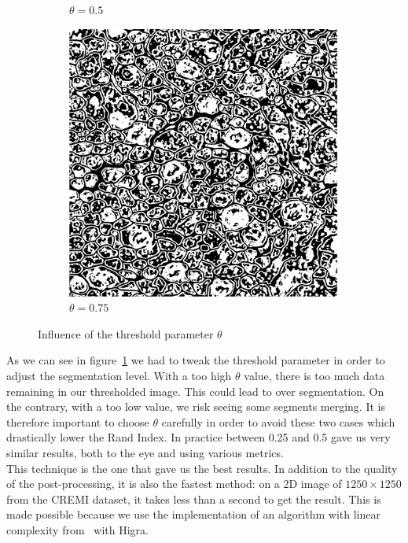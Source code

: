 \begin{figure}[!htbp]
\begin{subfigure}[t]{0.31\textwidth}
        \caption{$\theta = 0.5$}
    \end{subfigure}%
    \begin{subfigure}[t]{0.31\textwidth}
        \centering
        \includegraphics[height=0.9\textwidth]{./images/thresh_3.png}
        \caption{$\theta = 0.75$}
    \end{subfigure}
	\caption{Influence of the threshold parameter $\theta$}
	\label{fig:threshold}
\end{figure}

As we can see in figure~\ref{fig:threshold} we had to tweak the threshold
parameter in order to adjust the segmentation
level. With a too high $\theta$ value, there is too much data remaining in our
thresholded image. This could lead to over segmentation. On the contrary, with
a too low value, we risk seeing some segments merging. It is therefore
important to choose $\theta$ carefully in order to avoid these two cases which
drastically lower the Rand Index. In practice between 0.25 and 0.5 gave us very
similar results, both to the eye and using various metrics.\\

This technique is the one that gave us the best results. In addition to the
quality of the post-processing, it is also the fastest method: on a 2D image of
$1250\times1250$ from the CREMI dataset, it takes less than a second to get the result.
This is made possible because we use the implementation of an algorithm with
linear complexity from~\cite{cousty_watershed_2009} with Higra.\\

